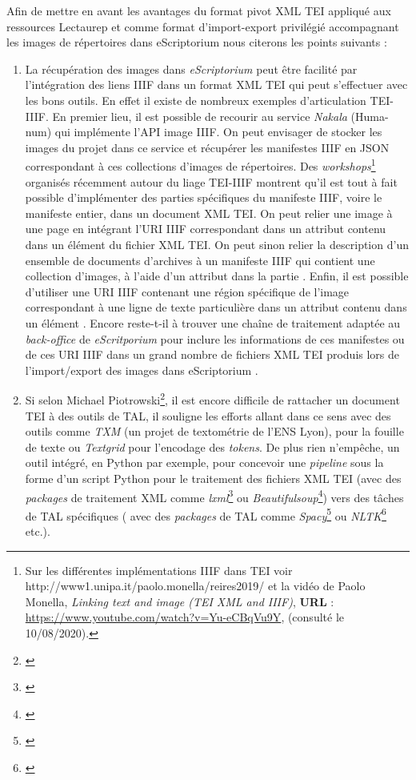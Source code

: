 Afin de mettre en avant les avantages du format pivot XML TEI appliqué aux ressources Lectaurep et comme format d'import-export privilégié accompagnant les images de répertoires dans eScriptorium nous citerons les points suivants :\\
\begin{enumerate}
    \item La récupération des images dans \textit{eScriptorium} peut être facilité par l'intégration des liens IIIF dans un format XML TEI qui peut s'effectuer avec les bons outils. En effet il existe de nombreux exemples d'articulation TEI-IIIF. En premier lieu, il est possible de recourir au service \textit{Nakala} (Huma-num) qui implémente l'API image IIIF. On peut envisager de stocker les images du projet dans ce service et récupérer les manifestes IIIF en JSON correspondant à ces collections d'images de répertoires. Des \textit{workshops}\footnote{Sur les différentes implémentations IIIF dans TEI voir http://www1.unipa.it/paolo.monella/reires2019/ et la vidéo de Paolo Monella, \textit{Linking text and image (TEI XML and IIIF)}, \textbf{URL} : \url{https://www.youtube.com/watch?v=Yu-eCBqVu9Y}, (consulté le 10/08/2020).} organisés récemment autour du liage TEI-IIIF montrent qu'il est tout à fait possible d'implémenter des parties spécifiques du manifeste IIIF, voire le manifeste entier, dans un document XML TEI. On peut relier une image à une page en intégrant l'URI IIIF correspondant dans un attribut  contenu dans un élément  du fichier XML TEI. On peut sinon relier la description d'un ensemble de documents d'archives à un manifeste IIIF qui contient une collection d'images, à l'aide d'un attribut  dans la partie . Enfin, il est possible d'utiliser une URI IIIF contenant une région spécifique de l'image correspondant à une ligne de texte particulière dans un attribut  contenu dans un élément . Encore reste-t-il à trouver une chaîne de traitement adaptée au \textit{back-office} de \textit{eScritporium} pour inclure les informations de ces manifestes ou de ces URI IIIF dans un grand nombre de fichiers XML TEI produis lors de l'import/export des images dans eScriptorium .
    \item Si selon Michael Piotrowski\footnote{\cite{romary_natural_2014}}, il est encore difficile de rattacher un document TEI à des outils de TAL, il souligne les efforts allant dans ce sens avec des outils comme \textit{TXM} (un projet de textométrie de l'ENS Lyon), pour la fouille de texte ou \textit{Textgrid} pour l'encodage des \textit{tokens}. De plus rien n'empêche, un outil intégré, en Python par exemple, pour concevoir une \textit{pipeline} sous la forme d'un script Python pour le traitement des fichiers XML TEI (avec des \textit{packages} de traitement XML comme \textit{lxml}\footnote{\cite{noauthor_lxml_nodate}} ou \textit{Beautifulsoup}\footnote{\cite{noauthor_bs4_nodate}}) vers des tâches de TAL spécifiques ( avec des \textit{packages} de TAL comme \textit{Spacy}\footnote{\cite{noauthor_spacy_nodate}} ou \textit{NLTK}\footnote{\cite{noauthor_nltk_nodate}} etc.).

\end{enumerate}
